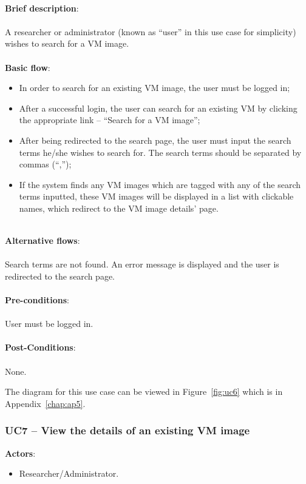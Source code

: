 \ \\
\textbf{Brief description}:\\
\ \\
A researcher or administrator (known as ``user'' in this use case for simplicity) wishes to search for a VM image.\\
\ \\
\textbf{Basic flow}:

\begin{itemize}
\item In order to search for an existing VM image, the user must be logged in;
\item After a successful login, the user can search for an existing VM by clicking the appropriate link -- ``Search for a VM image'';
\item After being redirected to the search page, the user must input the search terms he/she wishes to search for. The search terms should be separated by commas (``,'');
\item If the system finds any VM images which are tagged with any of the search terms inputted, these VM images will be displayed in a list with clickable names, which redirect to the VM image details' page.
\end{itemize}

\ \\
\textbf{Alternative flows}:\\
\ \\
Search terms are not found. An error message is displayed and the user is redirected to the search page.\\
\ \\
\textbf{Pre-conditions}:\\
\ \\
User must be logged in.\\
\ \\
\textbf{Post-Conditions}:\\
\ \\
None.

The diagram for this use case can be viewed in Figure~\ref{fig:uc6} which is in Appendix~\ref{chap:ap5}.

\subsubsection{UC7 -- View the details of an existing VM image}\label{uc7}

\textbf{Actors}:

\begin{itemize}
\item Researcher/Administrator.
\end{itemize}

